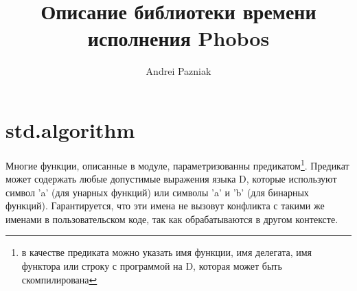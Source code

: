 \documentclass[12pt]{article}
\author{Andrei Pazniak}
\title{Описание библиотеки времени исполнения Phobos}
\begin{document}

\section{std.algorithm}
Многие функции, описанные в модуле, параметризованны предикатом\footnote{в качестве предиката можно указать имя функции, 
имя делегата, имя функтора или строку с программой на D, которая может быть скомпилирована}. Предикат может содержать любые 
допустимые выражения языка D, которые используют символ 'a' (для унарных функций) или символы 'a' и 'b' 
(для бинарных функций). Гарантируется, что эти имена не вызовут конфликта с такими же именами в пользовательском коде, 
так как обрабатываются в другом контексте.
\end{document}
